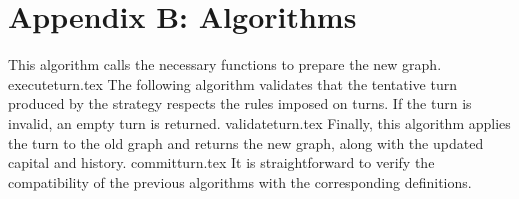 \section*{Appendix B: Algorithms}
  This algorithm calls the necessary functions to prepare the new graph.
  {executeturn.tex}
  The following algorithm validates that the tentative turn produced by the strategy respects the rules imposed on turns.
  If the turn is invalid, an empty turn is returned.
  {validateturn.tex}
  Finally, this algorithm applies the turn to the old graph and returns the new graph, along with the updated capital and
  history.
  {committurn.tex}
  It is straightforward to verify the compatibility of the previous algorithms with the corresponding definitions.

